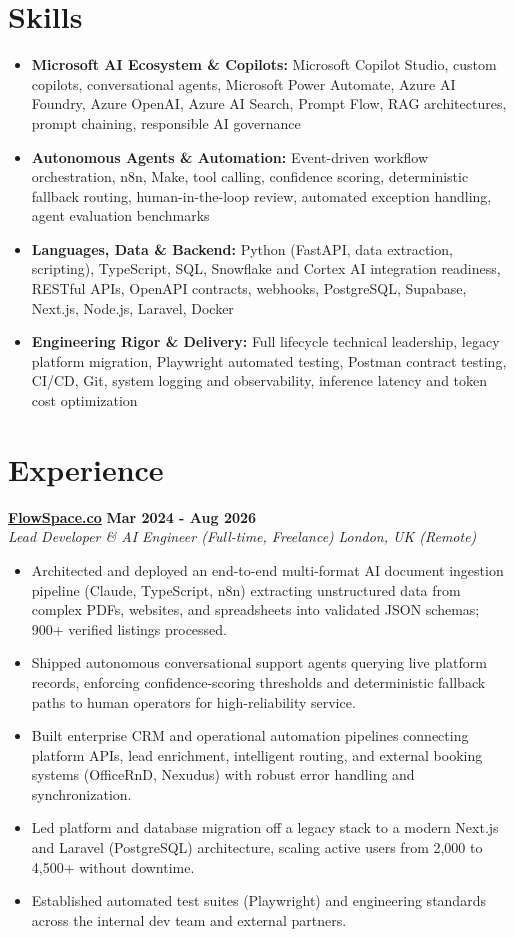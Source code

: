 \documentclass[a4paper,10pt]{article}
\newcommand{\role}[4]{%
  \textbf{#1} \hfill \textbf{#2}\\[1pt]%
  \textit{#3} \hfill \textit{#4}\\[2pt]%
}
\begin{document}
\section{Skills}
\begin{itemize}
  \item \textbf{Microsoft AI Ecosystem \& Copilots:} Microsoft Copilot Studio, custom copilots, conversational agents, Microsoft Power Automate, Azure AI Foundry, Azure OpenAI, Azure AI Search, Prompt Flow, RAG architectures, prompt chaining, responsible AI governance
  \item \textbf{Autonomous Agents \& Automation:} Event-driven workflow orchestration, n8n, Make, tool calling, confidence scoring, deterministic fallback routing, human-in-the-loop review, automated exception handling, agent evaluation benchmarks
  \item \textbf{Languages, Data \& Backend:} Python (FastAPI, data extraction, scripting), TypeScript, SQL, Snowflake and Cortex AI integration readiness, RESTful APIs, OpenAPI contracts, webhooks, PostgreSQL, Supabase, Next.js, Node.js, Laravel, Docker
  \item \textbf{Engineering Rigor \& Delivery:} Full lifecycle technical leadership, legacy platform migration, Playwright automated testing, Postman contract testing, CI/CD, Git, system logging and observability, inference latency and token cost optimization
\end{itemize}

\section{Experience}

\role{\href{https://flowspace.co}{FlowSpace.co}}{Mar 2024 - Aug 2026}{Lead Developer \& AI Engineer (Full-time, Freelance)}{London, UK (Remote)}
\begin{itemize}
  \item Architected and deployed an end-to-end multi-format AI document ingestion pipeline (Claude, TypeScript, n8n) extracting unstructured data from complex PDFs, websites, and spreadsheets into validated JSON schemas; 900+ verified listings processed.
  \item Shipped autonomous conversational support agents querying live platform records, enforcing confidence-scoring thresholds and deterministic fallback paths to human operators for high-reliability service.
  \item Built enterprise CRM and operational automation pipelines connecting platform APIs, lead enrichment, intelligent routing, and external booking systems (OfficeRnD, Nexudus) with robust error handling and synchronization.
  \item Led platform and database migration off a legacy stack to a modern Next.js and Laravel (PostgreSQL) architecture, scaling active users from 2,000 to 4,500+ without downtime.
  \item Established automated test suites (Playwright) and engineering standards across the internal dev team and external partners.
\end{itemize}
\end{document}
